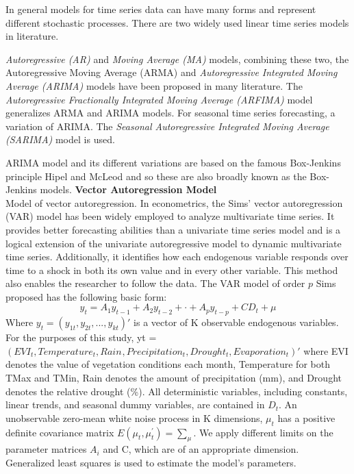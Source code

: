  In general models for time series data can have many forms and represent different stochastic processes. There are two widely used linear time
 series models in literature.
 
 \emph{Autoregressive (AR)} and \emph{Moving Average (MA)} models, combining these two, the Autoregressive Moving Average (ARMA) and
 \emph{Autoregressive Integrated Moving Average (ARIMA)} models have been proposed in many literature. The \emph{Autoregressive Fractionally
 	Integrated Moving Average (ARFIMA)} model generalizes ARMA and ARIMA models. For seasonal time series forecasting, a variation of ARIMA. The
 \emph{Seasonal Autoregressive Integrated Moving Average (SARIMA)}  model is used.
 
 ARIMA model and its different variations are based on the famous Box-Jenkins principle Hipel and McLeod \parencite{hipel1994} and so these are also broadly known as the Box-Jenkins models.
\textbf{Vector Autoregression Model}\\
Model of vector autoregression. In econometrics, the Sims' vector autoregression (VAR) model has been widely employed to analyze multivariate time series. It provides better forecasting abilities than a univariate time series model and is a logical extension of the univariate autoregressive model to dynamic multivariate time series. Additionally, it identifies how each endogenous variable responds over time to a shock in both its own value and in every other variable. This method also enables the researcher to follow the data. The VAR model of order $p$ Sims \parencite{sims1980macroeconomics} proposed has the following basic form:
\begin{equation}
	y_{t} = A_{1}y_{t-1} + A_{2}y_{t-2} +\cdot+A_{p}y_{t-p}+ CD_{t} + \mu 
\end{equation}
Where $ y_{t} = \left( y_{1t},y_{2t},...,y_{kt}\right)'$ is a vector of K observable endogenous variables. For the purposes of this study, yt = $(EVI_{t}, Temperature_{t}, Rain_{}, Precipitation_{t},Drought_{t},Evaporation_{t})'$ where EVI denotes the value of vegetation conditions  each month, Temperature for both TMax and TMin, Rain denotes the amount of precipitation (mm), and Drought denotes the relative drought (\%). All deterministic variables, including constants, linear trends, and seasonal dummy variables, are contained in $D_{t}$. An unobservable zero-mean white noise process in K dimensions, $\mu_{t}$ has a positive definite covariance matrix $E(\mu_{t},\mu_{t}^{'}) = \sum_{\mu}$. We  apply different limits on the parameter matrices $A_{i}$ and C, which are of an appropriate dimension.
Generalized least squares is used to estimate the model's parameters.

